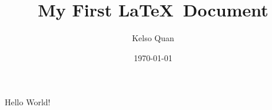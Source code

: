 \documentclass[11pt]{article}
\title{My First \LaTeX\ Document}
\author{Kelso Quan}
\date{\today}
\begin{document}
\maketitle
Hello World!
\end{document}
